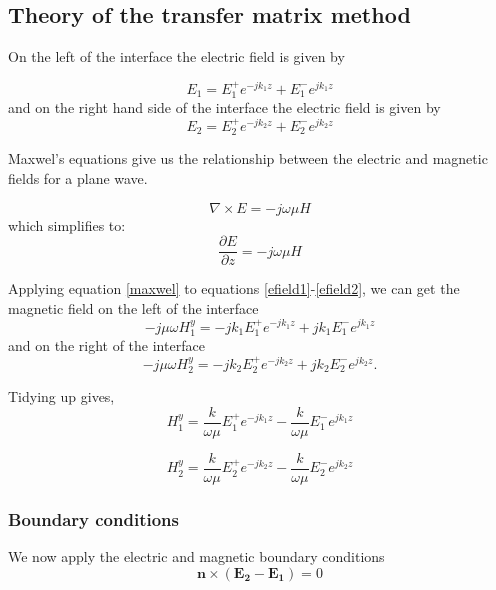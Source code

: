 \subsection{Theory of the transfer matrix method}  \label{ssec:transfer_matrix_theory}
On the left of the interface the electric field is given by

\begin{equation}
E_{1}=E^{+}_{1} e^{-j k_1 z}+E^{-}_{1} e^{j k_1 z}
\label{efield1}
\end{equation}
and on the right hand side of the interface the electric field is given by
\begin{equation}
E_{2}=E^{+}_{2} e^{-j k_2 z}+E^{-}_{2} e^{j k_2 z}
\label{efield2}
\end{equation}

Maxwel's equations give us the relationship between the electric and magnetic fields for a plane wave.

\begin{equation}
\nabla \times E=-j\omega \mu H 
\end{equation}
which simplifies to:
\begin{equation}
\frac{\partial E} {\partial z}=-j\omega \mu H 
\label{maxwel}
\end{equation}

Applying equation \ref{maxwel} to equations \ref{efield1}-\ref{efield2}, we can get the magnetic field on the left of the interface
\begin{equation}
-j \mu \omega H^{y}_{1}=-j k_1 E^{+}_{1} e^{-j k_1 z}+j k_1 E^{-}_{1} e^{j k_1 z}
\end{equation}
and on the right of the interface
\begin{equation}
-j \mu \omega H^{y}_{2}=-j k_2 E^{+}_{2} e^{-j k_2 z}+j k_2 E^{-}_{2} e^{j k_2 z}.
\end{equation}

Tidying up gives,
\begin{equation}
H^{y}_{1}=\frac{k}{\omega \mu}E^{+}_{1} e^{-j k_1 z}-\frac{k}{\omega \mu} E^{-}_{1} e^{j k_1 z}
\end{equation}

\begin{equation}
H^{y}_{2}=\frac{k}{\omega \mu}E^{+}_{2} e^{-j k_2 z}-\frac{k}{\omega \mu} E^{-}_{2} e^{j k_2 z}
\end{equation}

\subsubsection{Boundary conditions}
We now apply the electric and magnetic boundary conditions\cite{0953-8984-25-21-215301}
\begin{equation}
\mathbf{n} \times (\mathbf{E_2}-\mathbf{E_1})=0
\end{equation}

